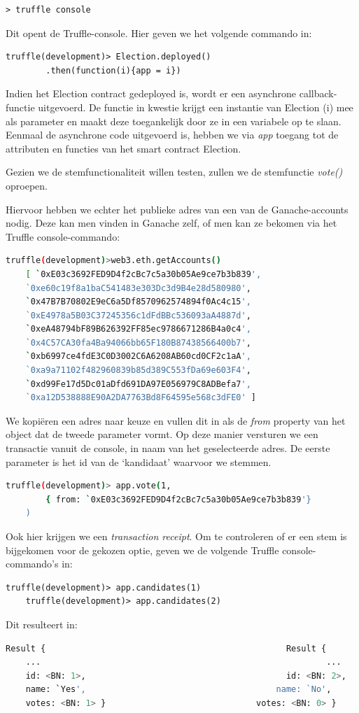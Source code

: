 	\begin{lstlisting}[numbers=none]
	> truffle console
	\end{lstlisting}
	
	Dit opent de Truffle-console. 
	Hier geven we het volgende commando in:

	\begin{lstlisting}[numbers=none]
	truffle(development)> Election.deployed()
		.then(function(i){app = i})
	\end{lstlisting}
	
	Indien het Election contract gedeployed is, wordt er een asynchrone callback-functie uitgevoerd.  De functie in kwestie krijgt  een instantie van Election (i) mee als parameter en maakt deze toegankelijk door ze in een variabele op te slaan. Eenmaal de asynchrone code uitgevoerd is, hebben we via \textit{app} toegang tot de attributen en functies van het smart contract Election.
	
	Gezien we de stemfunctionaliteit willen testen, zullen we de stemfunctie \textit{vote()} oproepen.
	
	Hiervoor hebben we echter het publieke adres van een van de Ganache-accounts nodig. Deze kan men vinden in Ganache zelf, of men kan ze bekomen via het Truffle console-commando:
	\begin{lstlisting}[numbers=none,language=bash]
	truffle(development)>web3.eth.getAccounts()
	[ `0xE03c3692FED9D4f2cBc7c5a30b05Ae9ce7b3b839',
	`0xe60c19f8a1baC541483e303Dc3d9B4e28d580980',
	`0x47B7B70802E9eC6a5Df8570962574894f0Ac4c15',
	`0xE4978a5B03C37245356c1dFdBBc536093aA4887d',
	`0xeA48794bF89B626392FF85ec9786671286B4a0c4',
	`0x4C57CA30fa4Ba94066bb65F180B87438566400b7',
	`0xb6997ce4fdE3C0D3002C6A6208AB60cd0CF2c1aA',
	`0xa9a71102f482960839b85d389C553fDa69e603F4',
	`0xd99Fe17d5Dc01aDfd691DA97E056979C8ADBefa7',
	`0xa12D538888E90A2DA7763Bd8F64595e568c3dFE0' ]
	\end{lstlisting}
	
	We kopiëren een adres naar keuze en vullen dit in als de \textit{from} property van het object dat de tweede parameter vormt. Op deze manier versturen we een transactie vanuit de console, in naam van het geselecteerde adres. De eerste parameter is het id van de `kandidaat' waarvoor we stemmen.
	\begin{lstlisting}[numbers=none,language=bash]
	truffle(development)> app.vote(1, 
		{ from: `0xE03c3692FED9D4f2cBc7c5a30b05Ae9ce7b3b839'}
	)
	\end{lstlisting}
	
	Ook hier krijgen we een \textit{transaction receipt}.
	Om te controleren of er een stem is bijgekomen voor de gekozen optie, geven we de volgende Truffle console-commando's in:
	\begin{lstlisting}[numbers=none]
	truffle(development)> app.candidates(1)
	truffle(development)> app.candidates(2)
	\end{lstlisting}
	Dit resulteert in:
	\begin{lstlisting}[numbers=none,language=bash]
	Result {												Result {
	...															...
	id: <BN: 1>,										id: <BN: 2>,
	name: `Yes',									  name: `No',
	votes: <BN: 1> }							  votes: <BN: 0> }
	\end{lstlisting}
	
